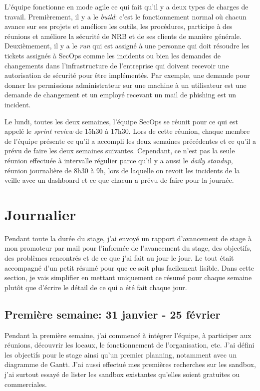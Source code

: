 L'équipe fonctionne en mode agile ce qui fait qu'il y a deux types de charges de travail. Premièrement, il y a le \textit{build}: c'est le fonctionnement normal où chacun avance sur ses projets et améliore les outils, les procédures, participe à des réunions et améliore la sécurité de NRB et de ses clients de manière générale. Deuxièmement, il y a le \textit{run} qui est assigné à une personne qui doit résoudre les tickets assignés à SecOps comme les incidents ou bien les demandes de changements dans l'infrastructure de l'entreprise qui doivent recevoir une autorisation de sécurité pour être implémentés. Par exemple, une demande pour donner les permissions administrateur sur une machine à un utilisateur est une demande de changement et un employé recevant un mail de phishing est un incident.

Le lundi, toutes les deux semaines, l'équipe SecOps se réunit pour ce qui est appelé le \textit{sprint review} de 15h30 à 17h30. Lors de cette réunion, chaque membre de l'équipe présente ce qu'il a accompli les deux semaines précédentes et ce qu'il a prévu de faire les deux semaines suivantes. Cependant, ce n'est pas la seule réunion effectuée à intervalle régulier parce qu'il y a aussi le \textit{daily standup}, réunion journalière de 8h30 à 9h, lors de laquelle on revoit les incidents de la veille avec un dashboard et ce que chacun a prévu de faire pour la journée.





\section{Journalier}

Pendant toute la durée du stage, j'ai envoyé un rapport d'avancement de stage à mon promoteur par mail pour l'informée de l'avancement du stage, des objectifs, des problèmes rencontrés et de ce que j'ai fait au jour le jour. Le tout était accompagné d'un petit résumé pour que ce soit plus facilement lisible. Dans cette section, je vais simplifier en mettant uniquement ce résumé pour chaque semaine plutôt que d'écrire le détail de ce qui a été fait chaque jour.



\subsection{Première semaine: 31 janvier - 25 février}

Pendant la première semaine, j'ai commencé à intégrer l'équipe, à participer aux réunions, découvrir les locaux, le fonctionnement de l'organisation, etc. J'ai défini les objectifs pour le stage ainsi qu'un premier planning, notamment avec un diagramme de Gantt. J'ai aussi effectué mes premières recherches sur les sandbox, j'ai surtout essayé de lister les sandbox existantes qu'elles soient gratuites ou commerciales.



